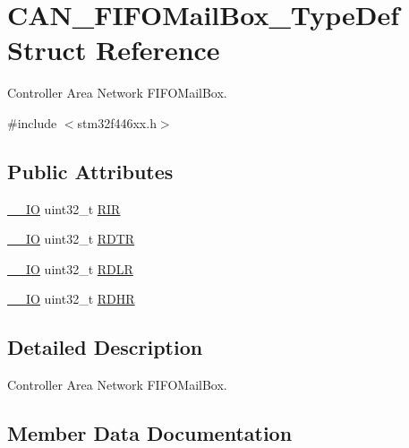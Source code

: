 \hypertarget{struct_c_a_n___f_i_f_o_mail_box___type_def}{}\section{C\+A\+N\+\_\+\+F\+I\+F\+O\+Mail\+Box\+\_\+\+Type\+Def Struct Reference}
\label{struct_c_a_n___f_i_f_o_mail_box___type_def}


Controller Area Network F\+I\+F\+O\+Mail\+Box.  




{\ttfamily \#include $<$stm32f446xx.\+h$>$}

\subsection*{Public Attributes}
\begin{DoxyCompactItemize}
\item 
\hyperlink{core__sc300_8h_aec43007d9998a0a0e01faede4133d6be}{\+\_\+\+\_\+\+IO} uint32\+\_\+t \hyperlink{struct_c_a_n___f_i_f_o_mail_box___type_def_a034504d43f7b16b320745a25b3a8f12d}{R\+IR}
\item 
\hyperlink{core__sc300_8h_aec43007d9998a0a0e01faede4133d6be}{\+\_\+\+\_\+\+IO} uint32\+\_\+t \hyperlink{struct_c_a_n___f_i_f_o_mail_box___type_def_a49d74ca8b402c2b9596bfcbe4cd051a9}{R\+D\+TR}
\item 
\hyperlink{core__sc300_8h_aec43007d9998a0a0e01faede4133d6be}{\+\_\+\+\_\+\+IO} uint32\+\_\+t \hyperlink{struct_c_a_n___f_i_f_o_mail_box___type_def_ac7d62861de29d0b4fcf11fabbdbd76e7}{R\+D\+LR}
\item 
\hyperlink{core__sc300_8h_aec43007d9998a0a0e01faede4133d6be}{\+\_\+\+\_\+\+IO} uint32\+\_\+t \hyperlink{struct_c_a_n___f_i_f_o_mail_box___type_def_a95890984bd67845015d40e82fb091c93}{R\+D\+HR}
\end{DoxyCompactItemize}


\subsection{Detailed Description}
Controller Area Network F\+I\+F\+O\+Mail\+Box. 

\subsection{Member Data Documentation}

